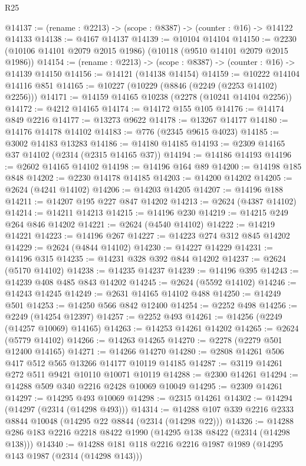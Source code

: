 \begin{lexlean}{R25}
\begin{coremodule}
@14137 := (rename : @2213) -> (scope : @8387) -> (counter : @16) -> @14122 @14133
@14138 := @4167 @14137
@14139 := @10104 @14104
@14150 := @2230 (@10106 @14101 @2079 @2015 @1986) (@10118 (@9510 @14101 @2079 @2015 @1986))
@14154 := (rename : @2213) -> (scope : @8387) -> (counter : @16) -> @14139 @14150
@14156 := @14121 (@14138 @14154)
@14159 := @10222 @14104 @14116 @851
@14165 := @10227 (@10229 (@8846 (@2249 (@2253 @14102) @2256)))
@14171 := @14159 @14165 @10238 (@2278 (@10241 @14104 @2256))
@14172 := @4212 @14165
@14174 := @14172 @155 @105
@14176 := @14174 @849 @2216
@14177 := @13273 @9622
@14178 := @13267 @14177
@14180 := @14176 @14178 @14102
@14183 := @776 (@2345 @9615 @4023)
@14185 := @3002 @14183 @13283
@14186 := @14180 @14185
@14193 := @2309 @14165 @37 @14102 (@2314 (@2315 @14165 @37))
@14194 := @14186 @14193
@14196 := @2602 @14165 @14102
@14198 := @14196 @164 @89
@14200 := @14198 @185 @848
@14202 := @2230 @14178 @14185
@14203 := @14200 @14202
@14205 := @2624 (@4241 @14102)
@14206 := @14203 @14205
@14207 := @14196 @188
@14211 := @14207 @195 @227 @847 @14202
@14213 := @2624 (@4387 @14102)
@14214 := @14211 @14213
@14215 := @14196 @230
@14219 := @14215 @249 @264 @846 @14202
@14221 := @2624 (@4540 @14102)
@14222 := @14219 @14221
@14223 := @14196 @267
@14227 := @14223 @274 @312 @845 @14202
@14229 := @2624 (@4844 @14102)
@14230 := @14227 @14229
@14231 := @14196 @315
@14235 := @14231 @328 @392 @844 @14202
@14237 := @2624 (@5170 @14102)
@14238 := @14235 @14237
@14239 := @14196 @395
@14243 := @14239 @408 @485 @843 @14202
@14245 := @2624 (@5592 @14102)
@14246 := @14243 @14245
@14249 := @2631 @14165 @14102 @488
@14250 := @14249 @501
@14253 := @14250 @566 @842 @12400
@14254 := @2252 @498
@14256 := @2249 (@14254 @12397)
@14257 := @2252 @493
@14261 := @14256 (@2249 (@14257 @10069) @14165)
@14263 := @14253 @14261 @14202
@14265 := @2624 (@5779 @14102)
@14266 := @14263 @14265
@14270 := @2278 (@2279 @501 @12400 @14165)
@14271 := @14266 @14270
@14280 := @2808 @14261 @506 @417 @512 @565 @13266 @14177 @10119 @14185
@14287 := @3119 @14261 @272 @511 @9421 @10110 @10071 @10119
@14288 := @2300 @14261
@14294 := @14288 @509 @340 @2216 @2428 @10069 @10049
@14295 := @2309 @14261
@14297 := @14295 @493 @10069
@14298 := @2315 @14261
@14302 := @14294 (@14297 (@2314 (@14298 @493)))
@14314 := @14288 @107 @339 @2216 @2333 @8844 @10048 (@14295 @22 @8844 (@2314 (@14298 @22)))
@14326 := @14288 @286 @183 @2216 @2218 @8422 @1990 (@14295 @138 @8422 (@2314 (@14298 @138)))
@14340 := @14288
    @181
    @118
    @2216
    @2216
    @1987
    @1989
    (@14295 @143 @1987 (@2314 (@14298 @143)))

\end{coremodule}
\end{lexlean}
